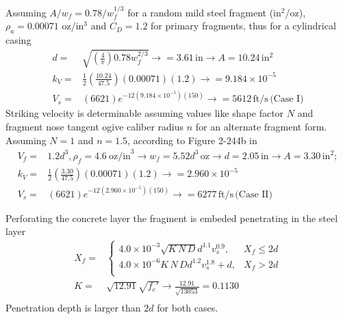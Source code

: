 \documentclass[]{article} %
\begin{document}
Assuming $A/w_f=0.78/w_f^{1/3}$ for a random mild steel fragment (in$^2$/oz), $\rho_a=0.00071$ oz/in$^3$ and $C_D=1.2$ for primary fragments, thus for a cylindrical casing
\begin{equation}\nonumber
\begin{aligned}
d=&\sqrt{\left(\frac{4}{\pi}\right)0.78w_f^{2/3}}\rightarrow=3.61\, \mathrm{in}\rightarrow A=10.24\,\mathrm{in}^2\\
k_V=&\frac{1}{2}\left(\frac{10.24}{47.5}\right)(0.00071)(1.2)\rightarrow=9.184\times10^{-5}\\
V_s=&(6621)e^{-12(9.184\times10^{-5})(150)}\rightarrow=5612\,\mathrm{ft/s}\,\text{(Case I)}
\end{aligned}
\end{equation}
Striking velocity is determinable assuming values like shape factor $N$ and fragment nose tangent ogive caliber radius $n$ for an alternate fragment form. Assuming $N=1$ and $n=1.5$, according to Figure 2-244b in \cite{ufc3340022014} 
\begin{align}\nonumber
V_f=&1.2d^3, \rho_f = 4.6~\mathrm{oz/in}^3\rightarrow w_f= 5.52d^3\,\mathrm{oz} \rightarrow d=2.05\,\mathrm{in}\rightarrow A=3.30\, \mathrm{in}^2;\\\nonumber
k_V=&\frac{1}{2}\left(\frac{3.30}{47.5}\right)(0.00071)(1.2)\rightarrow=2.960\times10^{-5}\\\nonumber
V_s=&(6621)e^{-12(2.960\times10^{-5})(150)}\rightarrow=6277\,\mathrm{ft/s}\,\text{(Case II)}
\end{align}

Perforating the concrete layer the fragment is embeded penetrating in the steel layer
\begin{equation}\nonumber\begin{aligned}
X_f=&\left\{\begin{array}{lr}
4.0\times10^{-3}\sqrt{K\,N\,D}d^{1.1}v_s^{0.9},& X_f\leq2d\\
4.0\times10^{-6}K\,N\,Dd^{1.2}v_s^{1.8}+d,& X_f>2d\\
\end{array}\right.\\
K=&\sqrt{12.91}{\sqrt{f_c'}}\rightarrow \frac{12.91}{\sqrt{13053}}=0.1130\\
\end{aligned}
\end{equation}
Penetration depth is larger than $2d$ for both cases.
\end{document}
